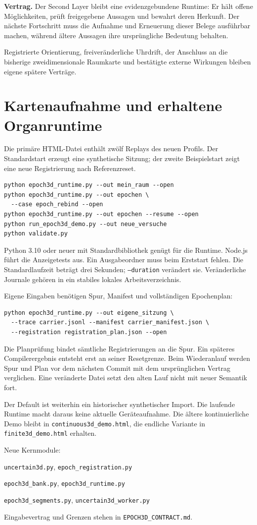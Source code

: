 \documentclass[11pt,a4paper]{article}
\newcommand{\contract}[1]{\vspace{3pt}\noindent\colorbox{pale}{\parbox{\dimexpr\linewidth-2\fboxsep}{\textbf{Vertrag.} #1}}\vspace{5pt}}
\newcommand{\nextsection}[2]{\clearpage{\color{accent}\small\textsf{#1}}\section{#2}}
\begin{document}
\contract{Der Second Layer bleibt eine evidenzgebundene Runtime:
Er hält offene Möglichkeiten, prüft freigegebene Aussagen und
bewahrt deren Herkunft. Der nächste Fortschritt muss die
Aufnahme und Erneuerung dieser Belege ausführbar machen, während
ältere Aussagen ihre ursprüngliche Bedeutung behalten.}

Registrierte Orientierung, freiveränderliche Uhrdrift, der
Anschluss an die bisherige zweidimensionale Raumkarte und
bestätigte externe Wirkungen bleiben eigene spätere Verträge.

\appendix
\nextsection{ANHANG A / BEDIENUNG}{Kartenaufnahme und erhaltene Organruntime}

Die primäre HTML-Datei enthält zwölf Replays des neuen Profils.
Der Standardstart erzeugt eine synthetische Sitzung; der zweite
Beispielstart zeigt eine neue Registrierung nach Referenzreset.
\begin{lstlisting}
python epoch3d_runtime.py --out mein_raum --open
python epoch3d_runtime.py --out epochen \
  --case epoch_rebind --open
python epoch3d_runtime.py --out epochen --resume --open
python run_epoch3d_demo.py --out neue_versuche
python validate.py
\end{lstlisting}
Python 3.10 oder neuer mit Standardbibliothek genügt für die
Runtime. Node.js führt die Anzeigetests aus. Ein Ausgabeordner
muss beim Erststart fehlen. Die Standardlaufzeit beträgt drei
Sekunden; \texttt{--duration} verändert sie. Veränderliche Journale
gehören in ein stabiles lokales Arbeitsverzeichnis.

Eigene Eingaben benötigen Spur, Manifest und vollständigen Epochenplan:
\begin{lstlisting}
python epoch3d_runtime.py --out eigene_sitzung \
  --trace carrier.jsonl --manifest carrier_manifest.json \
  --registration registration_plan.json --open
\end{lstlisting}
Die Planprüfung bindet sämtliche Registrierungen an die Spur.
Ein späteres Compilerergebnis entsteht erst an seiner Resetgrenze.
Beim Wiederanlauf werden Spur und Plan vor dem nächsten Commit
mit dem ursprünglichen Vertrag verglichen. Eine veränderte Datei
setzt den alten Lauf nicht mit neuer Semantik fort.

Der Default ist weiterhin ein historischer synthetischer Import.
Die laufende Runtime macht daraus keine aktuelle Geräteaufnahme.
Die ältere kontinuierliche Demo bleibt in
\texttt{continuous3d\_demo.html}, die endliche Variante in
\texttt{finite3d\_demo.html} erhalten.

Neue Kernmodule:\par
\texttt{uncertain3d.py}, \texttt{epoch\_registration.py}\par
\texttt{epoch3d\_bank.py}, \texttt{epoch3d\_runtime.py}\par
\texttt{epoch3d\_segments.py}, \texttt{uncertain3d\_worker.py}\par
Eingabevertrag und Grenzen stehen in \texttt{EPOCH3D\_CONTRACT.md}.
\end{document}
